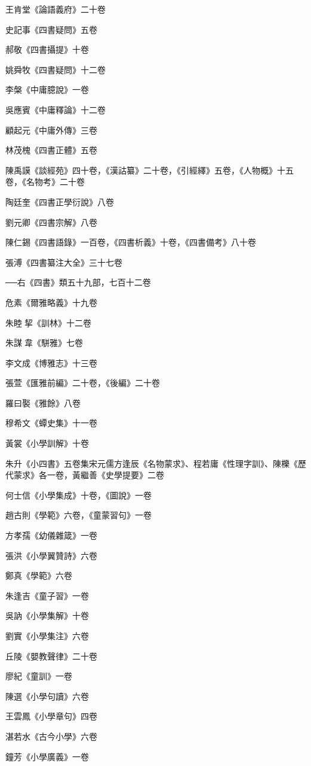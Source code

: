 王肯堂《論語義府》二十卷

史記事《四書疑問》五卷

郝敬《四書攝提》十卷

姚舜牧《四書疑問》十二卷

李槃《中庸臆說》一卷

吳應賓《中庸釋論》十二卷

顧起元《中庸外傳》三卷

林茂槐《四書正體》五卷

陳禹謨《談經苑》四十卷，《漢詁纂》二十卷，《引經繹》五卷，《人物概》十五卷，《名物考》二十卷

陶廷奎《四書正學衍說》八卷

劉元卿《四書宗解》八卷

陳仁錫《四書語錄》一百卷，《四書析義》十卷，《四書備考》八十卷

張溥《四書纂注大全》三十七卷

──右《四書》類五十九部，七百十二卷

危素《爾雅略義》十九卷

朱睦挈《訓林》十二卷

朱謀韋《駢雅》七卷

李文成《博雅志》十三卷

張萱《匯雅前編》二十卷，《後編》二十卷

羅曰褧《雅餘》八卷

穆希文《蟫史集》十一卷

黃裳《小學訓解》十卷

朱升《小四書》五卷集宋元儒方逢辰《名物蒙求》、程若庸《性理字訓》、陳櫟《歷代蒙求》各一卷，黃繼善《史學提要》二卷

何士信《小學集成》十卷，《圖說》一卷

趙古則《學範》六卷，《童蒙習句》一卷

方孝孺《幼儀雜箴》一卷

張洪《小學翼贊詩》六卷

鄭真《學範》六卷

朱逢吉《童子習》一卷

吳訥《小學集解》十卷

劉實《小學集注》六卷

丘陵《嬰教聲律》二十卷

廖紀《童訓》一卷

陳選《小學句讀》六卷

王雲鳳《小學章句》四卷

湛若水《古今小學》六卷

鐘芳《小學廣義》一卷

